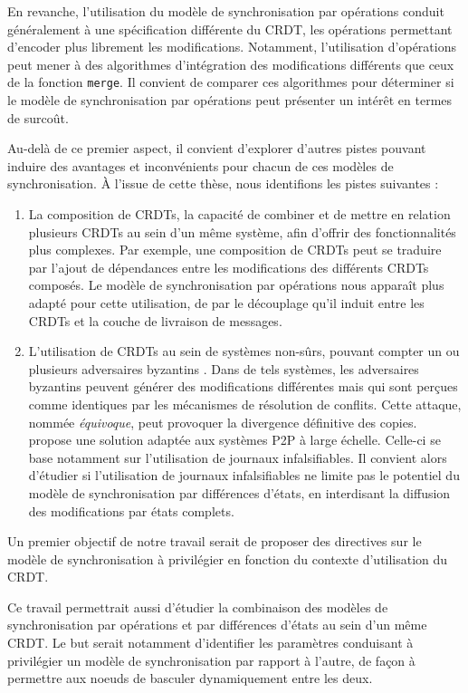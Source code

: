En revanche, l'utilisation du modèle de synchronisation par opérations conduit généralement à une spécification différente du \ac{CRDT}, les opérations permettant d'encoder plus librement les modifications.
Notamment, l'utilisation d'opérations peut mener à des algorithmes d'intégration des modifications différents que ceux de la fonction \texttt{merge}.
Il convient de comparer ces algorithmes pour déterminer si le modèle de synchronisation par opérations peut présenter un intérêt en termes de surcoût.

Au-delà de ce premier aspect, il convient d'explorer d'autres pistes pouvant induire des avantages et inconvénients pour chacun de ces modèles de synchronisation.
À l'issue de cette thèse, nous identifions les pistes suivantes :
\begin{enumerate}
    \item La composition de \acp{CRDT}, \ie la capacité de combiner et de mettre en relation plusieurs \acp{CRDT} au sein d'un même système, afin d'offrir des fonctionnalités plus complexes.
        Par exemple, une composition de \acp{CRDT} peut se traduire par l'ajout de dépendances entre les modifications des différents \acp{CRDT} composés.
        Le modèle de synchronisation par opérations nous apparaît plus adapté pour cette utilisation, de par le découplage qu'il induit entre les \acp{CRDT} et la couche de livraison de messages.
    \item L'utilisation de \acp{CRDT} au sein de systèmes non-sûrs, \ie pouvant compter un ou plusieurs adversaires byzantins \cite{2019-byzantine-generals-problem-lamport}.
        Dans de tels systèmes, les adversaires byzantins peuvent générer des modifications différentes mais qui sont perçues comme identiques par les mécanismes de résolution de conflits.
        Cette attaque, nommée \emph{équivoque}, peut provoquer la divergence définitive des copies.
        \cite{2018-prunable-authenticated-log-vic} propose une solution adaptée aux systèmes \ac{P2P} à large échelle.
        Celle-ci se base notamment sur l'utilisation de journaux infalsifiables.
        Il convient alors d'étudier si l'utilisation de journaux infalsifiables ne limite pas le potentiel du modèle de synchronisation par différences d'états, \eg en interdisant la diffusion des modifications par états complets.
\end{enumerate}

Un premier objectif de notre travail serait de proposer des directives sur le modèle de synchronisation à privilégier en fonction du contexte d'utilisation du \ac{CRDT}.

Ce travail permettrait aussi d'étudier la combinaison des modèles de synchronisation par opérations et par différences d'états au sein d'un même \ac{CRDT}.
Le but serait notamment d'identifier les paramètres conduisant à privilégier un modèle de synchronisation par rapport à l'autre, de façon à permettre aux noeuds de basculer dynamiquement entre les deux.
